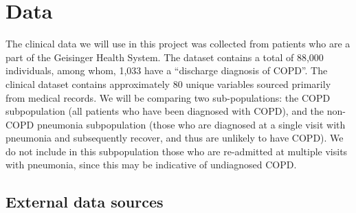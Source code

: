 \documentclass{article}
\begin{document}
\section{Data}

The clinical data we will use in this project was collected from 
patients who are a part of the Geisinger Health System. The dataset contains a total of 88,000 individuals, among whom, 1,033 have 
a ``discharge diagnosis of COPD''. The clinical dataset contains approximately 80 unique variables sourced primarily from medical records. We will be comparing two sub-populations: the COPD subpopulation (all patients who have been diagnosed with COPD), and the non-COPD pneumonia subpopulation (those who are diagnosed at a single 
visit with pneumonia and subsequently recover, and thus are unlikely to have COPD). We do not include in this subpopulation those who are re-admitted at multiple visits with pneumonia, since this may be indicative of undiagnosed COPD.


\subsection{External data sources}
\end{document}
